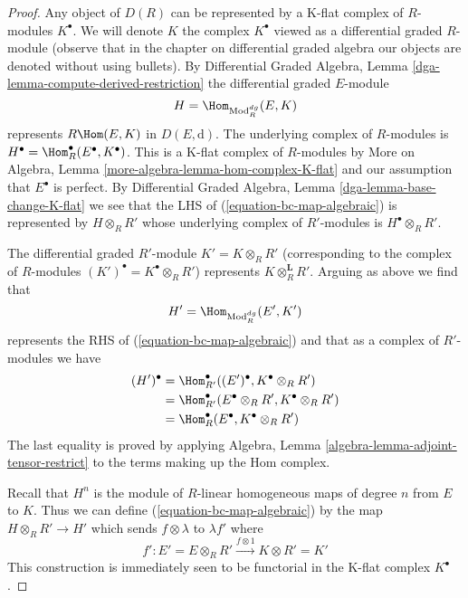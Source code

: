 \begin{proof}
\medskip\noindent
Any object of $D(R)$ can be represented by a K-flat complex of $R$-modules
$K^\bullet$. We will denote $K$ the complex $K^\bullet$ viewed as a
differential graded $R$-module (observe that in the chapter on differential
graded algebra our objects are denoted without using bullets). By
Differential Graded Algebra, Lemma \ref{dga-lemma-compute-derived-restriction}
the differential graded $E$-module
$$
H = \Hom_{\text{Mod}^{dg}_R}(E, K)
$$
represents $R\Hom(E, K)$ in $D(E, \text{d})$.
The underlying complex of $R$-modules is
$H^\bullet = \Hom^\bullet_R(E^\bullet, K^\bullet)$. This is a
K-flat complex of $R$-modules by
More on Algebra, Lemma \ref{more-algebra-lemma-hom-complex-K-flat}
and our assumption that $E^\bullet$ is perfect.
By Differential Graded Algebra, Lemma \ref{dga-lemma-base-change-K-flat}
we see that the LHS of (\ref{equation-bc-map-algebraic})
is represented by $H \otimes_R R'$ whose
underlying complex of $R'$-modules is $H^\bullet \otimes_R R'$.

\medskip\noindent
The differential graded $R'$-module $K' = K \otimes_R R'$
(corresponding to the complex of $R$-modules
$(K')^\bullet = K^\bullet \otimes_R R'$) represents
$K \otimes_R^\mathbf{L} R'$. Arguing as above we find that
$$
H' = \Hom_{\text{Mod}^{dg}_R}(E', K')
$$
represents the RHS of (\ref{equation-bc-map-algebraic})
and that as a complex of $R'$-modules we have
\begin{align*}
(H')^\bullet
& =
\Hom^\bullet_{R'}((E')^\bullet, K^\bullet \otimes_R R') \\
& =
\Hom^\bullet_{R'}(E^\bullet \otimes_R R', K^\bullet \otimes_R R') \\
& =
\Hom^\bullet_R(E^\bullet, K^\bullet \otimes_R R')
\end{align*}
The last equality is proved by applying
Algebra, Lemma \ref{algebra-lemma-adjoint-tensor-restrict}
to the terms making up the Hom complex.

\medskip\noindent
Recall that $H^n$ is the module of $R$-linear homogeneous maps of
degree $n$ from $E$ to $K$. Thus we can define
(\ref{equation-bc-map-algebraic}) by the map
$H \otimes_R R' \longrightarrow H'$
which sends $f \otimes \lambda$ to $\lambda f'$ where
$$
f' : E' = E \otimes_R R' \xrightarrow{f \otimes 1} K \otimes R' = K'
$$
This construction is immediately seen to be functorial in the K-flat complex
$K^\bullet$.


\end{proof}
